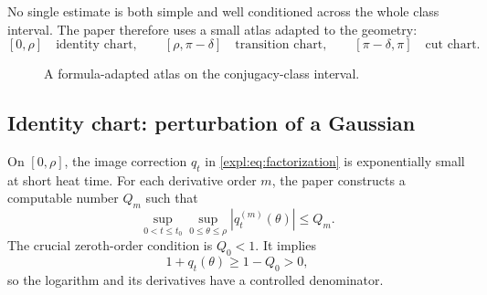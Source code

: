 \documentclass[11pt]{article}
\theoremstyle{definition}
\newcommand{\abs}[1]{\left|#1\right|}
\begin{document}
No single estimate is both simple and well conditioned across the whole
class interval.  The paper therefore uses a small atlas adapted to the
geometry:
\[
 [0,\rho]\quad\text{identity chart},\qquad
 [\rho,\pi-\delta]\quad\text{transition chart},\qquad
 [\pi-\delta,\pi]\quad\text{cut chart}.
\]

\begin{figure}[ht]
\centering
{}
\caption{A formula-adapted atlas on the conjugacy-class interval.}
\label{expl:fig:atlas}
\end{figure}

\subsection{Identity chart: perturbation of a Gaussian}

On $[0,\rho]$, the image correction $q_t$ in
\eqref{expl:eq:factorization} is exponentially small at short heat time.
For each derivative order $m$, the paper constructs a computable number
$Q_m$ such that
\begin{equation}\label{expl:eq:Q-bound}
 \sup_{0<t\le t_0}\sup_{0\le\theta\le\rho}
 \abs{q_t^{(m)}(\theta)}\le Q_m.
\end{equation}
The crucial zeroth-order condition is $Q_0<1$.  It implies
\begin{equation}\label{expl:eq:positive-floor}
 1+q_t(\theta)\ge1-Q_0>0,
\end{equation}
so the logarithm and its derivatives have a controlled denominator.
\end{document}
